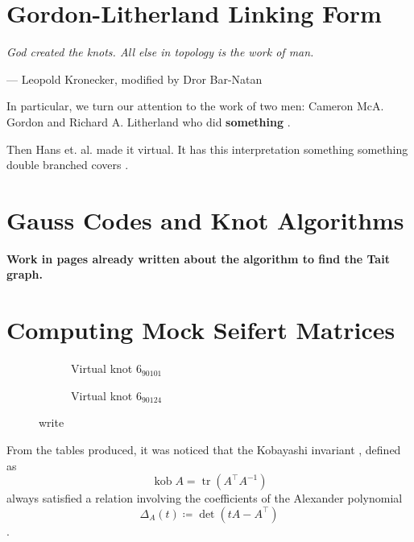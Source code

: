 \documentclass[12pt]{report}
\newcommand{\kob}{\operatorname{kob}}
\newcommand{\notered}[1]{{\color{Red} \textbf{#1}}}
\begin{document}
\chapter{Gordon-Litherland Linking Form}

\epigraph{\itshape God created the knots. All else in topology is the work of man.}{--- Leopold Kronecker, modified by Dror Bar-Natan}

In particular, we turn our attention to the work of two men: Cameron McA. Gordon and Richard A. Litherland who did \notered{something} \cite{signature-of-a-link}.

Then Hans et. al. made it virtual. It has this interpretation something something double branched covers \cite{gordon-litherland-pairing-thickened-surfaces}.

\chapter{Gauss Codes and Knot Algorithms}
\notered{Work in pages already written about the algorithm to find the Tait graph.}


\chapter{Computing Mock Seifert Matrices}

\begin{figure}[hbt!]
	\centering
	\hspace*{\fill}
	\begin{subfigure}[b]{0.4 \textwidth}
		\centering
		\def\svgscale{0.35}
		
		\caption{Virtual knot $6_{90101}$}
		\label{fig:6-90101_vknot}
	\end{subfigure}
	\hspace*{\fill}	\hspace*{\fill}	\hspace*{\fill}
	\begin{subfigure}[b]{0.4 \textwidth}
		\centering
		\def\svgscale{0.35}
		
		\caption{Virtual knot $6_{90124}$}
		\label{fig:6-90124_vknot}
	\end{subfigure}
	\hspace*{\fill} 
	\caption{write}
	\label{fig:counterexamples}
\end{figure}

From the tables produced, it was noticed that the Kobayashi invariant \cite{new-invariant-under-congruence}, defined as
\[\kob A = \operatorname{tr}(A^{\top}A^{-1})\]
always satisfied a relation involving the coefficients of the Alexander polynomial
\[\Delta_{A}(t) \coloneq \det(tA - A^{\top})\] \cite{mock-seifert-matrices}.
\end{document}
